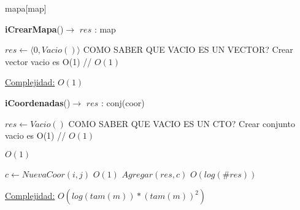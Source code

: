 \begin{Representacion}

\begin{Estructura}{mapa}[map]
	\begin{Tupla}[map]  
  	\end{Tupla}
  	
\end{Estructura}




  

  \AbsFc[]{}

\end{Representacion}

\begin{Algoritmos}


\begin{algorithm}[H]
{\textbf{iCrearMapa}()$\to$ $res$ : map}
\begin{algorithmic}[1]
   
\State $res \gets  \langle 0 , Vacio() \rangle $     COMO SABER QUE VACIO ES UN VECTOR?  \Comment Crear vector vacio es O(1) // $O(1)$

\medskip
\Statex \underline{Complejidad:} $O(1)$

\end{algorithmic}
\end{algorithm}

\begin{algorithm}[H]
{\textbf{iCoordenadas}()$\to$ $res$ : conj(coor)}
\begin{algorithmic}[1]
   
 
\State $res \gets Vacio() $     COMO SABER QUE VACIO ES UN CTO?  \Comment Crear conjunto vacio es O(1) // $O(1)$

	
		
		  \Comment $O(1)$
			
			\State $c \gets NuevaCoor(i, j) $  \Comment $O(1)$			
			\State $Agregar(res, c) $  \Comment $O(log(\#res))$			
			
		\EndIf
		
	\EndFor

\EndFor


\medskip
\Statex \underline{Complejidad:} $O(log(tam(m))*(tam(m))^2)$


\end{algorithmic}
\end{algorithm}
\end{Algoritmos}
